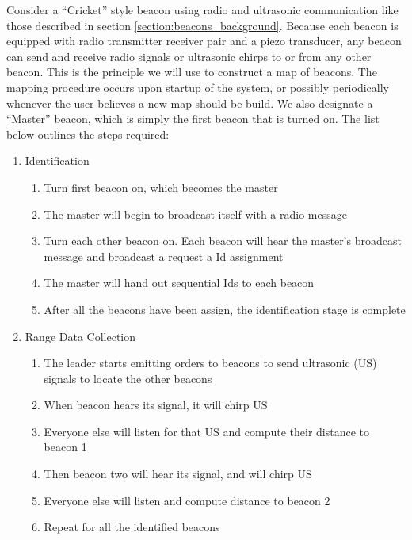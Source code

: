 \documentclass{article}
\begin{document}
    Consider a ``Cricket'' style beacon using radio and ultrasonic communication like those described in section \ref{section:beacons_background}. Because each beacon is equipped with radio transmitter receiver pair and a piezo transducer, any beacon can send and receive radio signals or ultrasonic chirps to or from any other beacon. This is the principle we will use to construct a map of beacons. The mapping procedure occurs upon startup of the system, or possibly periodically whenever the user believes a new map should be build. We also designate a ``Master'' beacon, which is simply the first beacon that is turned on. The list below outlines the steps required:

    \begin{enumerate}
      \item Identification \\
        \begin{enumerate}
          \item Turn first beacon on, which becomes the master
          \item The master will begin to broadcast itself with a radio message
          \item Turn each other beacon on. Each beacon will hear the master's broadcast message and broadcast a request a Id assignment
          \item The master will hand out sequential Ids to each beacon
          \item After all the beacons have been assign, the identification stage is complete
        \end{enumerate}
      \item Range Data Collection \\
        \begin{enumerate}
          \item The leader starts emitting orders to beacons to send ultrasonic (US) signals to locate the other beacons
          \item When beacon hears its signal, it will chirp US
          \item Everyone else will listen for that US and compute their distance to beacon 1
          \item Then beacon two will hear its signal, and will chirp US
          \item Everyone else will listen and compute distance to beacon 2
          \item Repeat for all the identified beacons
        \end{enumerate}

\end{enumerate}
\end{document}

